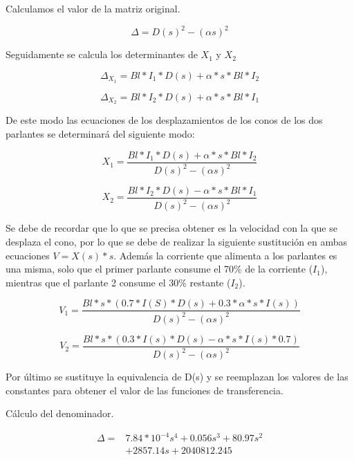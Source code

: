 \documentclass[journal]{IEEEtran}
\begin{document}
Calculamos el valor de la matriz original.

\begin{equation*}
  \Delta= D(s)^2- (\alpha s)^2
\end{equation*}

Seguidamente se calcula los determinantes de $X_1$ y $X_2$

\begin{equation*}
  \Delta_{X_1}= Bl*I_1*D(s)+ \alpha*s*Bl*I_2
\end{equation*}

\begin{equation*}
  \Delta_{X_2}= Bl*I_2*D(s)+ \alpha*s*Bl*I_1
\end{equation*}

De este modo las ecuaciones de los desplazamientos de los conos de los dos parlantes se determinará del siguiente modo:

\begin{equation*}
  X_1= \frac{Bl*I_1*D(s)+ \alpha*s*Bl*I_2}{D(s)^2- (\alpha s)^2} 
\end{equation*}

\begin{equation*}
  X_2= \frac{Bl*I_2*D(s)- \alpha*s*Bl*I_1}{D(s)^2- (\alpha s)^2} 
\end{equation*}


Se debe de recordar que lo que se precisa obtener es la velocidad  con la que se desplaza el cono, por lo que se debe de realizar la siguiente sustitución en ambas ecuaciones $V=X(s)*s$.
Además la corriente que alimenta a los parlantes es una misma, solo que el primer parlante consume el 70\% de la corriente ($I_1$), mientras que el parlante 2 consume el 30\% restante ($I_2$).


\begin{equation*}
  V_1= \frac{Bl*s*(0.7*I(S)*D(s)+ 0.3*\alpha*s*I(s))}{D(s)^2- (\alpha s)^2} 
\end{equation*}

\begin{equation*}
  V_2= \frac{Bl*s*(0.3*I(s)*D(s)- \alpha*s*I(s)*0.7)}{D(s)^2- (\alpha s)^2} 
\end{equation*}

Por último se sustituye la equivalencia de D(s) y se reemplazan los valores de las constantes para obtener el valor de las funciones de transferencia.

Cálculo del denominador.

\begin{equation*}
\begin{aligned}
  \Delta ={}& 7.84*10^{-4}s^{4}+0.056s^3+80.97s^2 \\
  &+2857.14s+2040812.245
\end{aligned}
\end{equation*}
\end{document}

